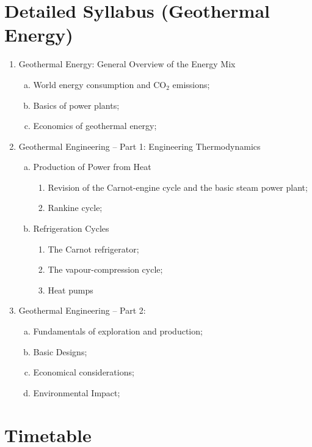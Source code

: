 \documentclass[11pt,oneside,a4paper]{article}
\begin{document}
\section{Detailed Syllabus (Geothermal Energy)}
%
\begin{enumerate}[{\bf Lecture 1:}]
%
\item Geothermal Energy: General Overview of the Energy Mix
\begin{enumerate}[(a)]
\item World energy consumption and CO$_{2}$ emissions;
\item Basics of power plants;
\item Economics of geothermal energy;
\end{enumerate}
%
\item Geothermal Engineering -- Part 1: Engineering Thermodynamics
%
\begin{enumerate}[(a)]
  \item Production of Power from Heat
     \begin{enumerate}
        \item Revision of the Carnot-engine cycle and the basic steam power plant; 
        \item Rankine cycle;
      \end{enumerate}
%
  \item Refrigeration Cycles
     \begin{enumerate}
        \item The Carnot refrigerator; 
        \item The vapour-compression cycle;
        \item Heat pumps
     \end{enumerate}
\end{enumerate}
%
\item Geothermal Engineering -- Part 2: 
\begin{enumerate}[(b)]
\item Fundamentals of exploration and production;
\item Basic Designs;
\item Economical considerations;
\item Environmental Impact;
\end{enumerate}
%
\end{enumerate}


\section{Timetable}
\end{document}
